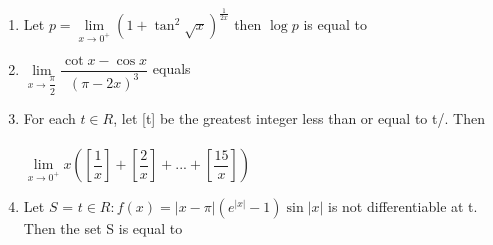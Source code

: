 \documentclass[journal,12pt,twocolumn]{IEEEtran}
\begin{document}
\begin{enumerate}
\item Let $p=\lim\limits_{x \to 0^+}\left(1+\tan^2\sqrt{x}\right)^{\frac{1}{2x}}$ then $\log p$ is equal to
\begin{itemize}
\end{itemize}

\item $\lim\limits_{x \to \dfrac{\pi}{2}}\dfrac{\cot x-\cos x}{(\pi-2x)^3}$ equals
\begin{itemize}
\end{itemize}

\item For each $t \in R$, let [t] be the greatest integer less than or equal to t/. Then\\
\\$\lim\limits_{x \to 0^+}x\left(\left[\dfrac{1}{x}\right]+\left[\dfrac{2}{x}\right]+...+\left[\dfrac{15}{x}\right]\right)$
\begin{itemize}
\end{itemize}

\item Let $S$ = $t \in R:f(x)=|x-\pi|(e^{|x|}-1)\sin |x|$ is not differentiable at t. Then the set S is equal to
\begin{itemize}
\end{itemize}


\end{enumerate}
\end{document}

